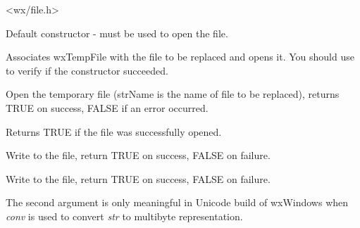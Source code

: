 
<wx/file.h>




\label{wxtempfilewxtempfilector}


Default constructor -  must be used to open the
file.

\label{wxtempfilewxtempfile}


Associates wxTempFile with the file to be replaced and opens it. You should use 
 to verify if the constructor succeeded.

\label{wxtempfileopen}


Open the temporary file (strName is the name of file to be replaced), returns
TRUE on success, FALSE if an error occurred.

\label{wxtempfileisopened}

Returns TRUE if the file was successfully opened.

\label{wxtempfilewrite}


Write to the file, return TRUE on success, FALSE on failure.

\label{wxtempfilewrites}


Write to the file, return TRUE on success, FALSE on failure.

The second argument is only meaningful in Unicode build of wxWindows when
{\it conv} is used to convert {\it str} to multibyte representation.

\label{wxtempfilecommit}


